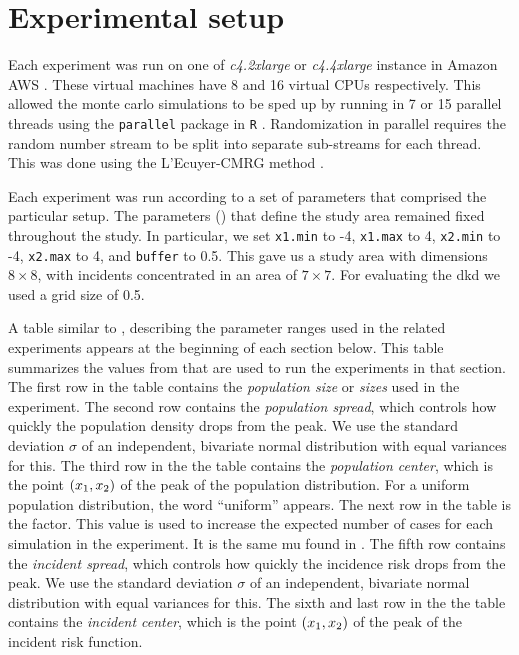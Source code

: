 \section{Experimental setup}
\label{sec:results:setup}

Each experiment was run on one of \textit{c4.2xlarge} or \textit{c4.4xlarge} instance in Amazon AWS \citep{aws:instancetypes}.
These virtual machines have 8 and 16 virtual CPUs respectively.
This allowed the monte carlo simulations to be sped up by running in 7 or 15 parallel threads using the \texttt{parallel} package in \texttt{R} \citep{r:parallel}.
Randomization in parallel requires the random number stream to be split into separate sub-streams for each thread. 
This was done using the L'Ecuyer-CMRG method \citep{lecuyer2002random}.

Each experiment was run according to a set of parameters that comprised the particular setup.
The parameters () that define the study area remained fixed throughout the study.
In particular, we set \texttt{x1.min} to -4, \texttt{x1.max} to 4, \texttt{x2.min} to -4, \texttt{x2.max} to 4, and \texttt{buffer} to 0.5.
This gave us a study area with dimensions $8 \times 8$, with incidents concentrated in an area of $7 \times 7$.
For evaluating the \gls{dkd} we used a grid size of 0.5.

A table similar to , describing the parameter ranges used in the related experiments appears at the beginning of each section below.
This table summarizes the values from  that are used to run the experiments in that section.
The first row in the table contains the \textit{population size} or \textit{sizes} used in the experiment.
The second row contains the \textit{population \gls{spread}}, which controls how quickly the population density drops from the peak.
We use the standard deviation $\sigma$ of an independent, bivariate normal distribution with equal variances for this.
The third row in the the table contains the \textit{population center}, which is the point $(x_1, x_2)$ of the peak of the population distribution.
For a uniform population distribution, the word ``uniform'' appears.
The next row in the table is the \gls{factor}.
This value is used to increase the expected number of cases for each simulation in the experiment.
It is the same \gls{mu} found in .
The fifth row contains the \textit{incident \gls{spread}}, which controls how quickly the incidence risk drops from the peak.
We use the standard deviation $\sigma$ of an independent, bivariate normal distribution with equal variances for this.
The sixth and last row in the the table contains the \textit{incident center}, which is the point $(x_1, x_2)$ of the peak of the incident risk function.

